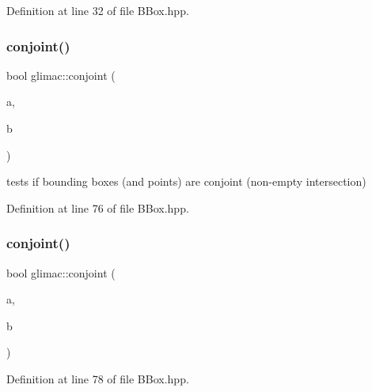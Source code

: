 Definition at line 32 of file B\+Box.\+hpp.

\mbox{\label{namespaceglimac_aafe905569a9383a2d51f203f89bac2e9}} 
\subsubsection{\texorpdfstring{conjoint()}{conjoint()}\hspace{0.1cm}{\footnotesize\ttfamily [1/3]}}
{\footnotesize\ttfamily bool glimac\+::conjoint (\begin{DoxyParamCaption}\item[{const \hyperlink{structglimac_1_1_b_box3f}{B\+Box3f} \&}]{a,  }\item[{const \hyperlink{structglimac_1_1_b_box3f}{B\+Box3f} \&}]{b }\end{DoxyParamCaption})\hspace{0.3cm}{\ttfamily [inline]}}

tests if bounding boxes (and points) are conjoint (non-\/empty intersection) 

Definition at line 76 of file B\+Box.\+hpp.

\mbox{\label{namespaceglimac_a5f57f8def5c4bad5e4ab5c0202fd70f3}} 
\subsubsection{\texorpdfstring{conjoint()}{conjoint()}\hspace{0.1cm}{\footnotesize\ttfamily [2/3]}}
{\footnotesize\ttfamily bool glimac\+::conjoint (\begin{DoxyParamCaption}\item[{const \hyperlink{structglimac_1_1_b_box3f}{B\+Box3f} \&}]{a,  }\item[{const \hyperlink{group__core__types_ga1c47e8b3386109bc992b6c48e91b0be7}{glm\+::vec3} \&}]{b }\end{DoxyParamCaption})\hspace{0.3cm}{\ttfamily [inline]}}



Definition at line 78 of file B\+Box.\+hpp.

\mbox{\label{namespaceglimac_ad0e509e8eac7c698b0bc3c4c5777fb74}} 
